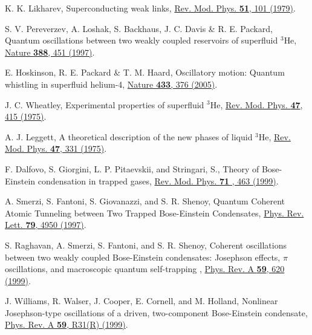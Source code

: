 \documentclass[twocolumn,prl,floatfix,citeautoscript,nofootinbib,superscriptaddress]{revtex4}
\begin{document}
\begin{thebibliography}{99}
 K. K. Likharev, {Superconducting weak links}, \href{https://doi.org/10.1103/RevModPhys.51.101}%
{Rev. Mod. Phys. \textbf{51}, 101 (1979)}.


 S. V. Pereverzev, A. Loshak, S. Backhaus, J. C.
Davis \& R. E. Packard, {Quantum oscillations between two weakly coupled
reservoirs of superfluid ${}^3$He}, \href{https://www.nature.com/nature/journal/v388/n6641/full/388449a0.html}%
{Nature \textbf{388}, 451 (1997)}.

 E. Hoskinson, R. E. Packard \& T. M. Haard, {%
Oscillatory motion: Quantum whistling in superfluid helium-4}, \href{https://doi.org/10.1038/433376a}%
{Nature \textbf{433}, 376 (2005)}.

 J. C. Wheatley, {Experimental properties of
superfluid ${}^3$He}, \href{https://doi.org/10.1103/RevModPhys.47.415}{Rev.
Mod. Phys. \textbf{47}, 415 (1975)}.

 A. J. Leggett, {A theoretical description of the new
phases of liquid ${}^3$He}, \href{https://doi.org/10.1103/RevModPhys.47.331}{%
Rev. Mod. Phys. \textbf{47}, 331 (1975)}.


 F. Dalfovo, S. Giorgini, L. P. Pitaevskii, and
Stringari, S., {Theory of Bose-Einstein condensation in trapped gases},
\href{https://doi.org/10.1103/RevModPhys.71.463}{Rev. Mod. Phys. \textbf{71}%
, 463 (1999)}.

 A. Smerzi, S. Fantoni, S. Giovanazzi, and S. R. Shenoy,
{Quantum Coherent Atomic Tunneling between Two Trapped Bose-Einstein
Condensates}, \href{https://doi.org/10.1103/PhysRevLett.79.4950}{Phys. Rev.
Lett. \textbf{79}, 4950 (1997)}.

 S. Raghavan, A. Smerzi, S. Fantoni, and S. R. Shenoy,
{Coherent oscillations between two weakly coupled Bose-Einstein condensates:
Josephson effects, $\pi$ oscillations, and macroscopic quantum self-trapping}%
, \href{https://doi.org/10.1103/PhysRevA.59.620}{Phys. Rev. A \textbf{59},
620 (1999)}.

 J. Williams, R. Walser, J. Cooper, E. Cornell, and M.
Holland, {Nonlinear Josephson-type oscillations of a driven, two-component
Bose-Einstein condensate}, \href{https://doi.org/10.1103/PhysRevA.59.R31}{%
Phys. Rev. A \textbf{59}, R31(R) (1999)}.


\end{thebibliography}
\end{document}
